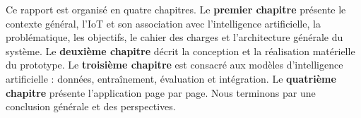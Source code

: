 Ce rapport est organisé en quatre chapitres. Le \textbf{premier chapitre} présente le contexte général, l'IoT et
son association avec l'intelligence artificielle, la problématique, les objectifs, le cahier des charges et
l'architecture générale du système. Le \textbf{deuxième chapitre} décrit la conception et la réalisation
matérielle du prototype. Le \textbf{troisième chapitre} est consacré aux modèles d'intelligence artificielle :
données, entraînement, évaluation et intégration. Le \textbf{quatrième chapitre} présente l'application
\app{} page par page. Nous terminons par une conclusion générale et des perspectives.
